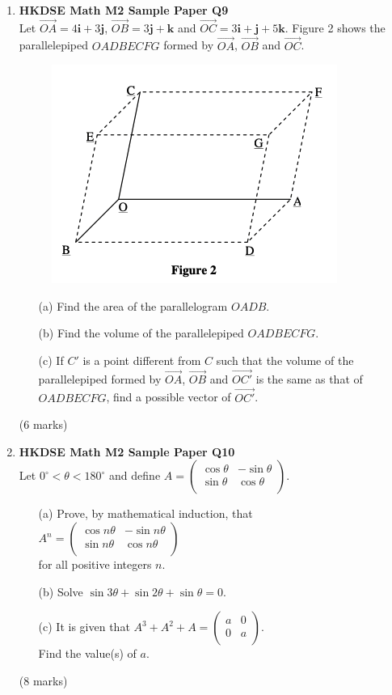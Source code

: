 \documentclass[12pt]{article}
\begin{document}
\begin{enumerate}
	\item \textbf{HKDSE Math M2 Sample Paper Q9}\\
	Let $\overrightarrow{OA} = 4\textbf{i} +3 \textbf{j}$, $\overrightarrow{OB} = 3 \textbf{j} +\textbf {k}$ and $\overrightarrow{OC} = 3\textbf{i} + \textbf{j} +5\textbf {k}$. Figure 2 shows the parallelepiped $OADBECFG$ formed by $\overrightarrow{OA}$, $\overrightarrow{OB}$ and $\overrightarrow{OC}$. 
	\begin{figure}[H]
		\centering
		\includegraphics[width = .5\linewidth]{SPFigure2}
	\end{figure}
	\begin{enumerate}
		\item [(a)]Find the area of the parallelogram $OADB$.  
		\item [(b)]Find the volume of the parallelepiped $OADBECFG$.
		\item [(c)]If $C'$ is a point different from $C$ such that the volume of the parallelepiped formed by $\overrightarrow{OA}$, $\overrightarrow{OB}$ and $\overrightarrow{OC'}$ is the same as that of $OADBECFG$, find a possible vector of $\overrightarrow{OC'}$.
	\end{enumerate}
	(6 marks)

	\item \textbf{HKDSE Math M2 Sample Paper Q10}\\
	Let $0^{\circ} < \theta < 180^{\circ}$ and define $A = \begin{pmatrix}\cos{\theta}&-\sin{\theta}\\\sin{\theta}&\cos{\theta}\\\end{pmatrix}$. 
	\begin{enumerate}
		\item [(a)]Prove, by mathematical induction, that \\
		$A^n = \begin{pmatrix}\cos{n\theta}&-\sin{n\theta}\\\sin{n\theta}&\cos{n\theta}\\\end{pmatrix}$\\
		for all positive integers $n$.
		\item [(b)]Solve $\sin{3\theta} + \sin{2\theta} + \sin{\theta} = 0$.
		\item [(c)]It is given that $A^3 + A^2 + A = \begin{pmatrix}a&0\\0&a\\\end{pmatrix}$.\\Find the value(s) of $a$. 
	\end{enumerate}
	(8 marks)


\end{enumerate}
\end{document}
